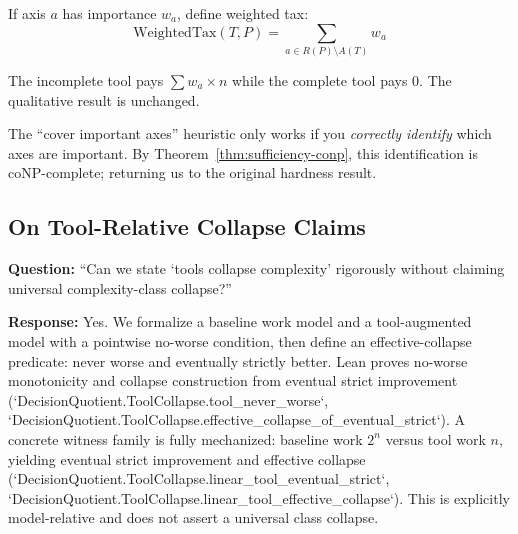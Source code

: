 If axis $a$ has importance $w_a$, define weighted tax:
\[\text{WeightedTax}(T, P) = \sum_{a \in R(P) \setminus A(T)} w_a\]

The incomplete tool pays $\sum w_a \times n$ while the complete tool pays 0. The qualitative result is unchanged.

The ``cover important axes'' heuristic only works if you \emph{correctly identify} which axes are important. By Theorem~\ref{thm:sufficiency-conp}, this identification is coNP-complete; returning us to the original hardness result.

\subsection{On Tool-Relative Collapse Claims}

\textbf{Question:} ``Can we state `tools collapse complexity' rigorously without claiming universal complexity-class collapse?''

\textbf{Response:} Yes. We formalize a baseline work model and a tool-augmented model with a pointwise no-worse condition, then define an effective-collapse predicate: never worse and eventually strictly better. Lean proves no-worse monotonicity and collapse construction from eventual strict improvement (`DecisionQuotient.ToolCollapse.tool\_never\_worse`, `DecisionQuotient.ToolCollapse.effective\_collapse\_of\_eventual\_strict`). A concrete witness family is fully mechanized: baseline work $2^n$ versus tool work $n$, yielding eventual strict improvement and effective collapse (`DecisionQuotient.ToolCollapse.linear\_tool\_eventual\_strict`, `DecisionQuotient.ToolCollapse.linear\_tool\_effective\_collapse`). This is explicitly model-relative and does not assert a universal class collapse.
